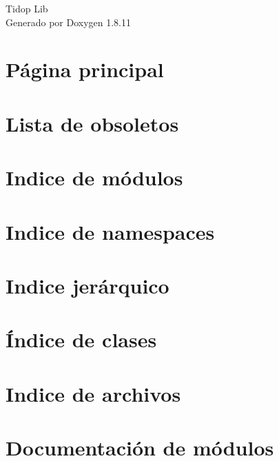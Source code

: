 \documentclass[twoside]{book}
\newcommand{\+}{\discretionary{\mbox{\scriptsize$\hookleftarrow$}}{}{}}
\newcommand{\clearemptydoublepage}{%
  \newpage{\pagestyle{empty}\cleardoublepage}%
}
\begin{document}
\hypersetup{pageanchor=false,
             bookmarksnumbered=true,
             pdfencoding=unicode
            }
\begin{titlepage}
\vspace*{7cm}
\begin{center}%
{\Large Tidop Lib }\\
\vspace*{1cm}
{\large Generado por Doxygen 1.8.11}\\
\end{center}
\end{titlepage}
\clearemptydoublepage
\tableofcontents
\clearemptydoublepage
{}
\hypersetup{pageanchor=true}

\chapter{Página principal}
\label{index}\hypertarget{index}{}
\chapter{Lista de obsoletos}
\label{deprecated}
\hypertarget{deprecated}{}

\chapter{Indice de módulos}

\chapter{Indice de namespaces}

\chapter{Indice jerárquico}

\chapter{Índice de clases}

\chapter{Indice de archivos}

\chapter{Documentación de módulos}










\end{document}
